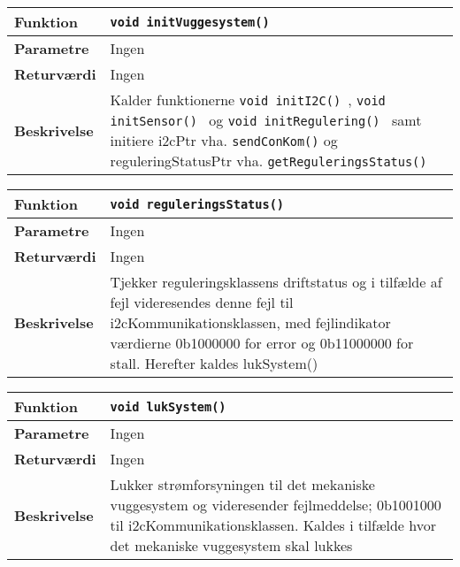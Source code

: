 \begin{center}
    \begin{tabular}{ | l | p{} |}
    \hline
    \textbf{Funktion}	& \verb+void initVuggesystem() +						\\ \hline
    \textbf{Parametre} 	& Ingen		\\ \hline
    \textbf{Returværdi}	& Ingen 								\\ \hline
    \textbf{Beskrivelse}	& Kalder funktionerne \verb+void initI2C() +, \verb+void initSensor() + og \verb+void initRegulering() + samt initiere i2cPtr vha. \verb+sendConKom()+ og reguleringStatusPtr vha. \verb+getReguleringsStatus() +		\\ \hline
    \end{tabular}
\end{center}

\begin{center}
    \begin{tabular}{ | l | p{} |}
    \hline
    \textbf{Funktion}	& \verb+void reguleringsStatus() +						\\ \hline
    \textbf{Parametre} 	& Ingen		\\ \hline
    \textbf{Returværdi}	& Ingen 								\\ \hline
    \textbf{Beskrivelse}	& Tjekker reguleringsklassens driftstatus og i tilfælde af fejl videresendes denne fejl til i2cKommunikationsklassen, med fejlindikator værdierne 0b1000000 for error og 0b11000000 for stall. Herefter kaldes lukSystem()		\\ \hline
    \end{tabular}
\end{center}

\begin{center}
    \begin{tabular}{ | l | p{} |}
    \hline
    \textbf{Funktion}	& \verb+void lukSystem() +						\\ \hline
    \textbf{Parametre} 	& Ingen		\\ \hline
    \textbf{Returværdi}	& Ingen 								\\ \hline
    \textbf{Beskrivelse}	& Lukker strømforsyningen til det mekaniske vuggesystem og videresender fejlmeddelse; 0b1001000 til i2cKommunikationsklassen. Kaldes i tilfælde hvor det mekaniske vuggesystem skal lukkes		\\ \hline
    \end{tabular}
\end{center}


